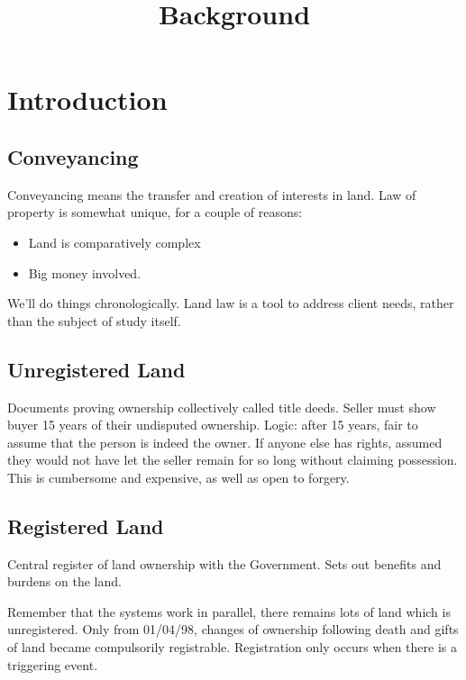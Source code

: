 \documentclass[
]{article}
\title{Background}
\author{}
\date{}
\providecommand{\tightlist}{%
  \setlength{\itemsep}{0pt}\setlength{\parskip}{0pt}}
\begin{document}
\maketitle

{
\setcounter{tocdepth}{3}
\tableofcontents
}
\hypertarget{introduction}{%
\section{Introduction}\label{introduction}}

\hypertarget{conveyancing}{%
\subsection{Conveyancing}\label{conveyancing}}

Conveyancing means the transfer and creation of interests in land. Law
of property is somewhat unique, for a couple of reasons:

\begin{itemize}
\tightlist
\item
  Land is comparatively complex
\item
  Big money involved.
\end{itemize}

We'll do things chronologically. Land law is a tool to address client
needs, rather than the subject of study itself.

\hypertarget{unregistered-land}{%
\subsection{Unregistered Land}\label{unregistered-land}}

Documents proving ownership collectively called title deeds. Seller must
show buyer 15 years of their undisputed ownership. Logic: after 15
years, fair to assume that the person is indeed the owner. If anyone
else has rights, assumed they would not have let the seller remain for
so long without claiming possession. This is cumbersome and expensive,
as well as open to forgery.

\hypertarget{registered-land}{%
\subsection{Registered Land}\label{registered-land}}

Central register of land ownership with the Government. Sets out
benefits and burdens on the land.

Remember that the systems work in parallel, there remains lots of land
which is unregistered. Only from 01/04/98, changes of ownership
following death and gifts of land became compulsorily registrable.
Registration only occurs when there is a triggering event.
\end{document}
